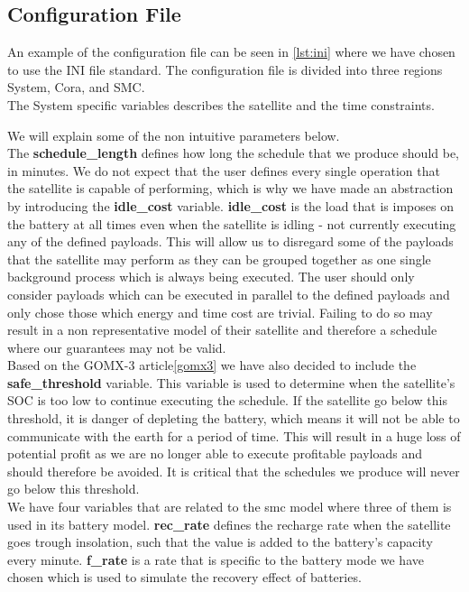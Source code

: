 \subsection{Configuration File} \label{subsec:init}
An example of the configuration file can be seen in \cref{lst:ini} where we have chosen to use the INI file standard.
The configuration file is divided into three regions System, Cora, and SMC.\\
The System specific variables describes the satellite and the time constraints.

We will explain some of the non intuitive parameters below.\\
The \textbf{schedule\_length} defines how long the schedule that we produce should be, in minutes.
We do not expect that the user defines every single operation that the satellite is capable of performing, which is why we have made an abstraction by introducing the \textbf{idle\_cost} variable. 
\textbf{idle\_cost} is the load that is imposes on the battery at all times even when the satellite is idling - not currently executing any of the defined payloads.
This will allow us to disregard some of the payloads that the satellite may perform as they can be grouped together as one single background process which is always being executed.
The user should only consider payloads which can be executed in parallel to the defined payloads and only chose those which energy and time cost are trivial.
Failing to do so may result in a non representative model of their satellite and therefore a schedule where our guarantees may not be valid.\\
Based on the GOMX-3 article\ref{gomx3} we have also decided to include the \textbf{safe\_threshold} variable.
This variable is used to determine when the satellite's SOC is too low to continue executing the schedule.
If the satellite go below this threshold, it is danger of depleting the battery, which means it will not be able to communicate with the earth for a period of time.
This will result in a huge loss of potential profit as we are no longer able to execute profitable payloads and should therefore be avoided.
It is critical that the schedules we produce will never go below this threshold.\\
We have four variables that are related to the \gls{smc} model where three of them is used in its battery model.
\textbf{rec\_rate} defines the recharge rate when the satellite goes trough insolation, such that the value is added to the battery's capacity every minute.
\textbf{f\_rate} is a rate that is specific to the battery mode we have chosen which is used to simulate the recovery effect of batteries.
